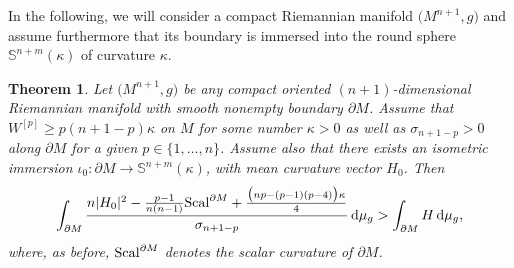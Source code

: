 \documentclass[pdftex]{sigma}
\numberwithin{equation}{section}
\newtheorem{Theorem}{Theorem}[section]
\begin{document}
In the following, we will consider a compact Riemannian manifold $\bigl(M^{n+1},g\bigr)$ and assume furthermore that its boundary is immersed into the round sphere $\mathbb{S}^{n+m}(\kappa)$ of curvature $\kappa$.
\begin{Theorem}\label{t:MwithdelMinSn+m}
Let $\bigl(M^{n+1},g\bigr)$ be any compact oriented $(n+1)$-dimensional Riemannian manifold with smooth nonempty boundary $\partial M$. Assume that $W^{[p]}\geq p(n+1-p)\kappa$ on $M$ for some number $\kappa>0$ as well as $\sigma_{n+1-p}>0$ along $\partial M$ for a given $p\in\{1,\dots,n\}$.
Assume also that there exists an isometric immersion $\iota_0\colon\partial M\to\mathbb{S}^{n+m}(\kappa)$, with mean curvature vector $H_0$.
Then
\begin{equation*}
\int_{\partial M}\frac{n|H_0|^2-\frac{p-1}{n(n-1)}{\rm Scal}^{\partial M}+\frac{\bigl(np-(p-1)(p-4)\bigr)\kappa}{4}}{\sigma_{n+1-p}}\,{\rm d}\mu_g>\int_{\partial M}H\,{\rm d}\mu_g,
\end{equation*}
where, as before, ${\rm Scal}^{\partial M}$ denotes the scalar curvature of $\partial M$.
\end{Theorem}
\end{document}
